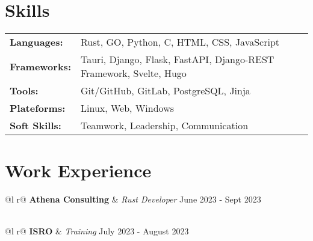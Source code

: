 \documentclass[a4paper,12pt]{article}
\begin{document}
\section{Skills}
\begin{tabularx}{\linewidth}{@{}l X@{}}
\textbf{Languages:} &  \normalsize{Rust, GO, Python, C, HTML, CSS, JavaScript}\\
\textbf{Frameworks:}  &  \normalsize{Tauri, Django, Flask, FastAPI, Django-REST Framework, Svelte, Hugo}\\  
\textbf{Tools:} &  \normalsize{Git/GitHub, GitLab, PostgreSQL, Jinja} \\
\textbf{Plateforms:} &  \normalsize{Linux, Web, Windows}\\
\textbf{Soft Skills:} &  \normalsize{Teamwork, Leadership, Communication}\\
\end{tabularx}

\section{Work Experience}

\begin{tabularx}{\linewidth}{ @{}l r@{} }
\textbf {Athena Consulting} & \emph{Rust Developer} \hfill June 2023 - Sept 2023 \\[3.75pt]
  \\
\end{tabularx}

\begin{tabularx}{\linewidth}{ @{}l r@{} }
\textbf {ISRO} & \emph{Training} \hfill July 2023 - August 2023 \\[3.75pt]
  \\
\end{tabularx}

\end{document}
